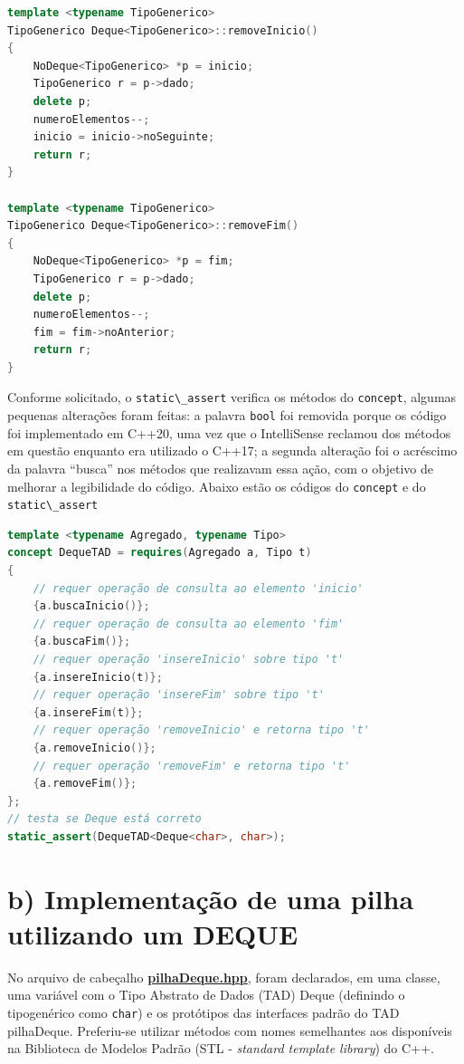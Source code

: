 \documentclass[
  brazilian,
  paper=a4,
  oneside  ,captions=tableheading
]{scrbook}
\newcommand{\passthrough}[1]{#1}
\begin{document}
\begin{lstlisting}[language={C++}]
template <typename TipoGenerico>
TipoGenerico Deque<TipoGenerico>::removeInicio()
{
    NoDeque<TipoGenerico> *p = inicio;
    TipoGenerico r = p->dado;
    delete p;
    numeroElementos--;
    inicio = inicio->noSeguinte;
    return r;
}

template <typename TipoGenerico>
TipoGenerico Deque<TipoGenerico>::removeFim() 
{                                             
    NoDeque<TipoGenerico> *p = fim;           
    TipoGenerico r = p->dado;
    delete p;
    numeroElementos--;
    fim = fim->noAnterior;              
    return r;
}
\end{lstlisting}

Conforme solicitado, o \passthrough{\lstinline!static\_assert!} verifica
os métodos do \passthrough{\lstinline!concept!}, algumas pequenas
alterações foram feitas: a palavra \passthrough{\lstinline!bool!} foi
removida porque os código foi implementado em C++20, uma vez que o
IntelliSense reclamou dos métodos em questão enquanto era utilizado o
C++17; a segunda alteração foi o acréscimo da palavra ``busca'' nos
métodos que realizavam essa ação, com o objetivo de melhorar a
legibilidade do código. Abaixo estão os códigos do
\passthrough{\lstinline!concept!} e do
\passthrough{\lstinline!static\_assert!}

\begin{lstlisting}[language={C++}]
template <typename Agregado, typename Tipo>
concept DequeTAD = requires(Agregado a, Tipo t)
{
    // requer operação de consulta ao elemento 'inicio'
    {a.buscaInicio()};
    // requer operação de consulta ao elemento 'fim'
    {a.buscaFim()};
    // requer operação 'insereInicio' sobre tipo 't'
    {a.insereInicio(t)};
    // requer operação 'insereFim' sobre tipo 't'
    {a.insereFim(t)};
    // requer operação 'removeInicio' e retorna tipo 't'
    {a.removeInicio()};
    // requer operação 'removeFim' e retorna tipo 't'
    {a.removeFim()};
};
// testa se Deque está correto
static_assert(DequeTAD<Deque<char>, char>);
\end{lstlisting}

\hypertarget{b-implementauxe7uxe3o-de-uma-pilha-utilizando-um-deque}{%
\section{b) Implementação de uma pilha utilizando um
DEQUE}\label{b-implementauxe7uxe3o-de-uma-pilha-utilizando-um-deque}}

No arquivo de cabeçalho
\href{https://github.com/ecostadelle/lista_pilhas_filas/blob/main/include/pilhaDeque.hpp}{\textbf{pilhaDeque.hpp}},
foram declarados, em uma classe, uma variável com o Tipo Abstrato de
Dados (TAD) Deque (definindo o tipogenérico como
\passthrough{\lstinline!char!}) e os protótipos das interfaces padrão do
TAD pilhaDeque. Preferiu-se utilizar métodos com nomes semelhantes aos
disponíveis na Biblioteca de Modelos Padrão (STL - \emph{standard
template library}) do C++.
\end{document}
